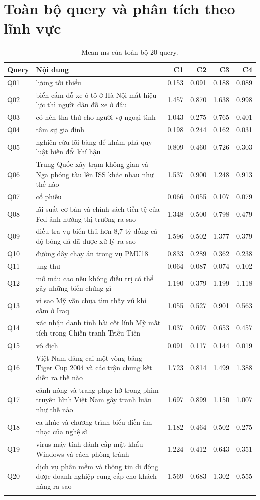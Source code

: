 \clearpage\section{Toàn bộ query và phân tích theo lĩnh vực}

\begin{longtable}{|l|p{}|r|r|r|r|}
\hline
Query & Nội dung & C1 & C2 & C3 & C4 \\
\hline
\endhead
Q01 & lương tối thiểu & 0.153 & 0.091 & 0.188 & 0.089 \\
Q02 & biển cấm đỗ xe ô tô ở Hà Nội mất hiệu lực thì người dân đỗ xe ở đâu & 1.457 & 0.870 & 1.638 & 0.998 \\
Q03 & có nên tha thứ cho người vợ ngoại tình & 1.043 & 0.275 & 0.765 & 0.401 \\
Q04 & tâm sự gia đình & 0.198 & 0.244 & 0.162 & 0.031 \\
Q05 & nghiên cứu lõi băng để khám phá quy luật biến đổi khí hậu & 0.809 & 0.460 & 0.726 & 0.303 \\
Q06 & Trung Quốc xây trạm không gian và Nga phóng tàu lên ISS khác nhau như thế nào & 1.537 & 0.900 & 1.248 & 0.913 \\
Q07 & cổ phiếu & 0.066 & 0.055 & 0.107 & 0.079 \\
Q08 & lãi suất cơ bản và chính sách tiền tệ của Fed ảnh hưởng thị trường ra sao & 1.348 & 0.500 & 0.798 & 0.479 \\
Q09 & điều tra vụ biển thủ hơn 8,7 tỷ đồng cá độ bóng đá đã được xử lý ra sao & 1.596 & 0.502 & 1.377 & 0.379 \\
Q10 & đường dây chạy án trong vụ PMU18 & 0.833 & 0.289 & 0.362 & 0.238 \\
Q11 & ung thư & 0.064 & 0.087 & 0.074 & 0.102 \\
Q12 & mỡ máu cao nếu không điều trị có thể gây những biến chứng gì & 1.190 & 0.379 & 1.199 & 1.118 \\
Q13 & vì sao Mỹ vẫn chưa tìm thấy vũ khí cấm ở Iraq & 1.055 & 0.527 & 0.901 & 0.563 \\
Q14 & xác nhận danh tính hài cốt lính Mỹ mất tích trong Chiến tranh Triều Tiên & 1.037 & 0.697 & 0.653 & 0.457 \\
Q15 & vô địch & 0.091 & 0.117 & 0.144 & 0.019 \\
Q16 & Việt Nam đăng cai một vòng bảng Tiger Cup 2004 và các trận chung kết diễn ra thế nào & 1.723 & 0.814 & 1.499 & 1.388 \\
Q17 & cảnh nóng và trang phục hở trong phim truyền hình Việt Nam gây tranh luận như thế nào & 1.697 & 0.899 & 1.150 & 1.007 \\
Q18 & ca khúc và chương trình biểu diễn âm nhạc của nghệ sĩ & 1.182 & 0.464 & 0.502 & 0.275 \\
Q19 & virus máy tính đánh cắp mật khẩu Windows và cách phòng tránh & 1.224 & 0.412 & 0.643 & 0.351 \\
Q20 & dịch vụ phần mềm và thông tin di động được doanh nghiệp cung cấp cho khách hàng ra sao & 1.569 & 0.683 & 1.302 & 0.555 \\
\hline
\caption{Mean ms của toàn bộ 20 query.} \\
\end{longtable}

